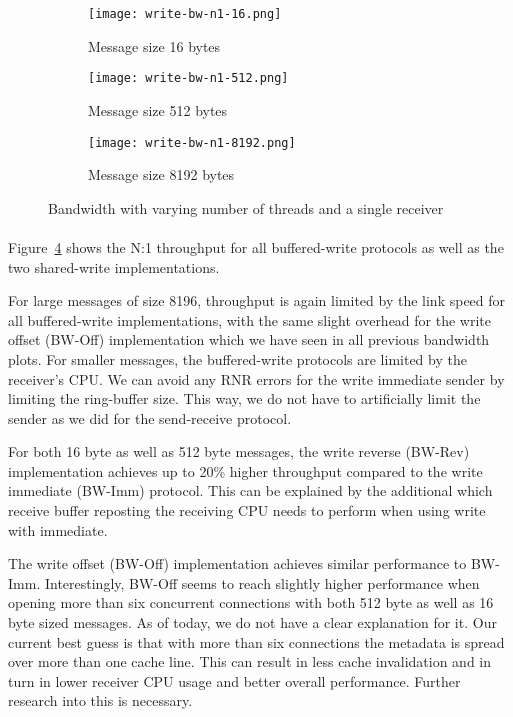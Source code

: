 \begin{figure}[ht]
  \centering
\begin{subfigure}[b]{0.49\textwidth}
  \centering
  \texttt{[image: write-bw-n1-16.png]}
  \caption{Message size 16 bytes}
  \label{fig:plot-write-bw-n1-16}
\end{subfigure}
\begin{subfigure}[b]{0.49\textwidth}
  \centering
  \texttt{[image: write-bw-n1-512.png]}
  \caption{Message size 512 bytes}
  \label{fig:plot-write-bw-n1-512}
\end{subfigure}
\begin{subfigure}[b]{0.49\textwidth}
  \centering
  \texttt{[image: write-bw-n1-8192.png]}
  \caption{Message size 8192 bytes}
  \label{fig:plot-write-bw-n1-8192}
\end{subfigure}
  \caption{Bandwidth with varying number of threads and a single receiver}
  \label{fig:plot-write-bw-n1}
\end{figure}

\paragraph{} Figure~\ref{fig:plot-write-bw-n1} shows the N:1 throughput for all buffered-write protocols as 
well as the two shared-write implementations.

For large messages of size 8196, throughput is again limited by the link speed for all buffered-write implementations, 
with the same slight overhead for the write offset (BW-Off) implementation which we have seen in all previous bandwidth plots.
For smaller messages, the buffered-write protocols are limited by the receiver's CPU. We can avoid any 
RNR errors for the write immediate sender by limiting the ring-buffer size. This way, we do not have to artificially limit 
the sender as we did for the send-receive protocol.

For both 16 byte as well as 512 byte messages, the write reverse \mbox{(BW-Rev)} implementation achieves up to 20\% higher throughput
compared to the write immediate (BW-Imm) protocol. This can be explained by the additional which receive buffer reposting the 
receiving CPU needs to perform when using write with immediate. 

The write offset (BW-Off) implementation achieves similar performance to BW-Imm. Interestingly, BW-Off seems to reach
slightly higher performance when opening more than six concurrent connections with both 512 byte as well as 16 byte
sized messages. As of
today, we do not have a clear explanation for it. Our current best guess is that with more than six connections the 
metadata is spread over more than one cache line. This can result in less cache invalidation and in turn in lower receiver 
CPU usage and better overall performance. Further research into this is necessary. 


